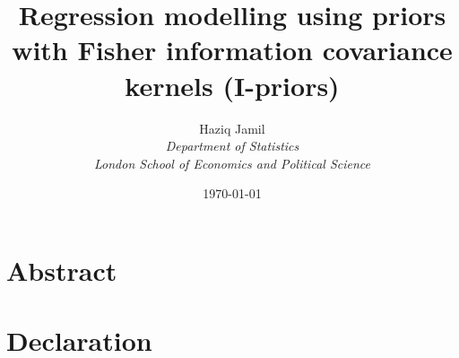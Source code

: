 \documentclass[a4paper,11pt,showframe]{report}
\begin{document}
\title{Regression modelling using priors with Fisher information covariance kernels (I-priors)}
\author{	Haziq Jamil\\
			\normalsize{\it{Department of Statistics}}\\
			\normalsize{\it{London School of Economics and Political Science}}
}
\date{\normalsize\today}
\maketitle

\chapter*{Abstract} 
\chapter*{Declaration} 

\hTOCandLists
\clearpage

\end{document}
